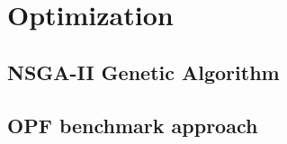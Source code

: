 \section{Optimization}


\begin{frame}{}
    \tableofcontents[currentsection]
\end{frame}



\subsection{NSGA-II Genetic Algorithm}


\subsection{OPF benchmark approach}


